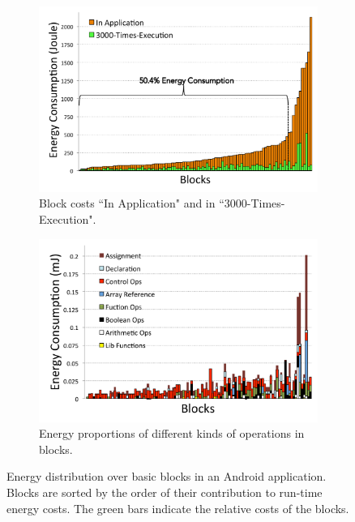 \documentclass[oneside]{book}
\begin{document}
\begin{figure}
	\centering
	\begin{subfigure}[b]{0.49\textwidth}
		\centering            
		\includegraphics[width = \textwidth]{Figs/blocks_in_program.pdf}
		\caption{ Block costs ``In Application" and in ``3000-Times-Execution".}
		\label{fig:blocks_in_program}
	\end{subfigure}
	\begin{subfigure}[b]{0.49\textwidth}
		\centering
		\includegraphics[width=\textwidth]{Figs/op_in_block.pdf}
		\caption{Energy proportions of different kinds of operations in blocks.}
		\label{fig:op_in_block}
	\end{subfigure}
	\caption{Energy distribution over basic blocks in an Android application. Blocks are sorted by the order of their contribution to run-time energy costs. The green bars indicate the relative costs of the blocks.}\label{fig:block}
\end{figure}
\end{document}
